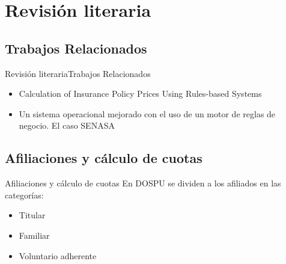 \documentclass[10pt]{beamer}
\begin{document}
\section{Revisión literaria}

\subsection{Trabajos Relacionados}
\begin{frame}{Revisión literaria}{Trabajos Relacionados}
    \begin{itemize}
        \item Calculation of Insurance Policy Prices Using Rules-based Systems
        \item Un sistema operacional mejorado con el uso de un motor de reglas de negocio. El caso SENASA
    \end{itemize}
\end{frame}

\subsection{Afiliaciones y cálculo de cuotas}

\begin{frame}{Afiliaciones y cálculo de cuotas}
    En DOSPU se dividen a los afiliados en las categorías:
    \begin{itemize}
        \item Titular
        \item Familiar
        \item Voluntario adherente
    \end{itemize}
\end{frame}

\end{document}
